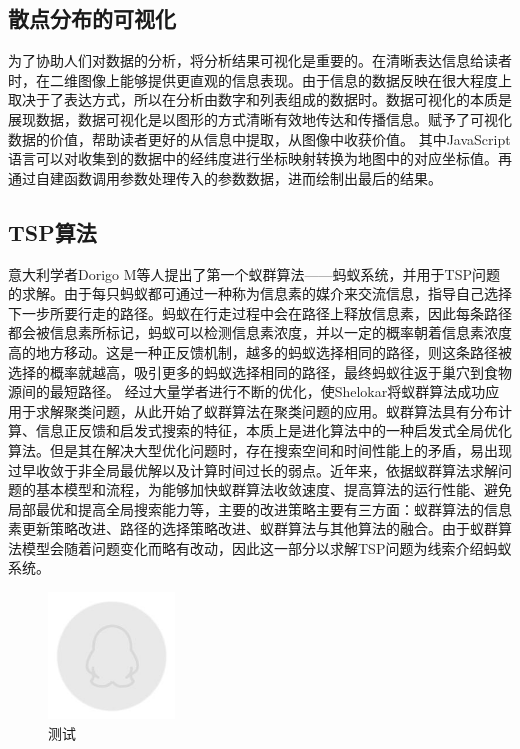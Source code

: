 \subsection{散点分布的可视化}
为了协助人们对数据的分析，将分析结果可视化是重要的。在清晰表达信息给读者时，在二维图像上能够提供更直观的信息表现。由于信息的数据反映在很大程度上取决于了表达方式，所以在分析由数字和列表组成的数据时。数据可视化的本质是展现数据，数据可视化是以图形的方式清晰有效地传达和传播信息。赋予了可视化数据的价值，帮助读者更好的从信息中提取，从图像中收获价值。
其中JavaScript语言可以对收集到的数据中的经纬度进行坐标映射转换为地图中的对应坐标值。再通过自建函数调用参数处理传入的参数数据，进而绘制出最后的结果。

\subsection{TSP算法}
意大利学者Dorigo M等人提出了第一个蚁群算法——蚂蚁系统，并用于TSP问题的求解。由于每只蚂蚁都可通过一种称为信息素的媒介来交流信息，指导自己选择下一步所要行走的路径。蚂蚁在行走过程中会在路径上释放信息素，因此每条路径都会被信息素所标记，蚂蚁可以检测信息素浓度，并以一定的概率朝着信息素浓度高的地方移动。这是一种正反馈机制，越多的蚂蚁选择相同的路径，则这条路径被选择的概率就越高，吸引更多的蚂蚁选择相同的路径，最终蚂蚁往返于巢穴到食物源间的最短路径。
经过大量学者进行不断的优化，使Shelokar将蚁群算法成功应用于求解聚类问题，从此开始了蚁群算法在聚类问题的应用。蚁群算法具有分布计算、信息正反馈和启发式搜索的特征，本质上是进化算法中的一种启发式全局优化算法。但是其在解决大型优化问题时，存在搜索空间和时间性能上的矛盾，易出现过早收敛于非全局最优解以及计算时间过长的弱点。近年来，依据蚁群算法求解问题的基本模型和流程，为能够加快蚁群算法收敛速度、提高算法的运行性能、避免局部最优和提高全局搜索能力等，主要的改进策略主要有三方面：蚁群算法的信息素更新策略改进、路径的选择策略改进、蚁群算法与其他算法的融合。由于蚁群算法模型会随着问题变化而略有改动，因此这一部分以求解TSP问题为线索介绍蚂蚁系统。


\begin{figure}[htbp]
	\centering
	\includegraphics [width=0.3\textwidth]{./figures/figure1.jpg}
	\caption{测试}
\end{figure}

